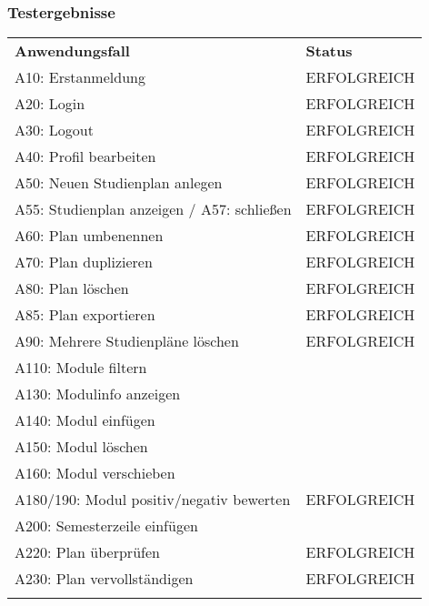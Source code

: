 \subsubsection*{Testergebnisse}

\begin{longtable}{| >{\hspace{0pt}} p{} | >{\hspace{0pt}} p{} |}
	\hline
	\textbf{Anwendungsfall} & \textbf{Status} \\ 
	\hhline{|=|=|}  
	\endfirsthead
	\endhead
	A10: Erstanmeldung & ERFOLGREICH \\
	\hline
	A20: Login & ERFOLGREICH \\
	\hline
	A30: Logout & ERFOLGREICH \\
	\hline
	A40: Profil bearbeiten & ERFOLGREICH \\
	\hline
	A50: Neuen Studienplan anlegen & ERFOLGREICH \\
	\hline
	A55: Studienplan anzeigen / A57: schließen & ERFOLGREICH \\
	\hline
	A60: Plan umbenennen & ERFOLGREICH \\
	\hline
	A70: Plan duplizieren & ERFOLGREICH \\
	\hline
	A80: Plan löschen & ERFOLGREICH \\
	\hline
	A85: Plan exportieren & ERFOLGREICH  \\
	\hline
	A90: Mehrere Studienpläne löschen & ERFOLGREICH \\
	\hline
	A110: Module filtern & \\
	\hline
	A130: Modulinfo anzeigen & \\
	\hline
	A140: Modul einfügen & \\
	\hline
	A150: Modul löschen & \\
	\hline
	A160: Modul verschieben & \\
	\hline
	A180/190: Modul positiv/negativ bewerten & ERFOLGREICH  \\
	\hline
	A200: Semesterzeile einfügen & \\
	\hline
	A220: Plan überprüfen & ERFOLGREICH \\
	\hline
	A230: Plan vervollständigen & ERFOLGREICH \\
	\hhline{|=|=|}
\end{longtable}

